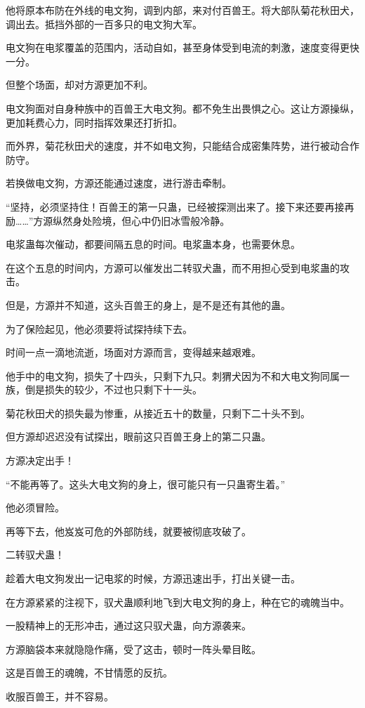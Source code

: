 \begin{this_body}
他将原本布防在外线的电文狗，调到内部，来对付百兽王。将大部队菊花秋田犬，调出去。抵挡外部的一百多只的电文狗大军。

电文狗在电浆覆盖的范围内，活动自如，甚至身体受到电流的刺激，速度变得更快一分。

但整个场面，却对方源更加不利。

电文狗面对自身种族中的百兽王大电文狗。都不免生出畏惧之心。这让方源操纵，更加耗费心力，同时指挥效果还打折扣。

而外界，菊花秋田犬的速度，并不如电文狗，只能结合成密集阵势，进行被动合作防守。

若换做电文狗，方源还能通过速度，进行游击牵制。

“坚持，必须坚持住！百兽王的第一只蛊，已经被探测出来了。接下来还要再接再励……”方源纵然身处险境，但心中仍旧冰雪般冷静。

电浆蛊每次催动，都要间隔五息的时间。电浆蛊本身，也需要休息。

在这个五息的时间内，方源可以催发出二转驭犬蛊，而不用担心受到电浆蛊的攻击。

但是，方源并不知道，这头百兽王的身上，是不是还有其他的蛊。

为了保险起见，他必须要将试探持续下去。

时间一点一滴地流逝，场面对方源而言，变得越来越艰难。

他手中的电文狗，损失了十四头，只剩下九只。刺猬犬因为不和大电文狗同属一族，倒是损失的较少，不过也只剩下十一头。

菊花秋田犬的损失最为惨重，从接近五十的数量，只剩下二十头不到。

但方源却迟迟没有试探出，眼前这只百兽王身上的第二只蛊。

方源决定出手！

“不能再等了。这头大电文狗的身上，很可能只有一只蛊寄生着。”

他必须冒险。

再等下去，他岌岌可危的外部防线，就要被彻底攻破了。

二转驭犬蛊！

趁着大电文狗发出一记电浆的时候，方源迅速出手，打出关键一击。

在方源紧紧的注视下，驭犬蛊顺利地飞到大电文狗的身上，种在它的魂魄当中。

一股精神上的无形冲击，通过这只驭犬蛊，向方源袭来。

方源脑袋本来就隐隐作痛，受了这击，顿时一阵头晕目眩。

这是百兽王的魂魄，不甘情愿的反抗。

收服百兽王，并不容易。


\end{this_body}

